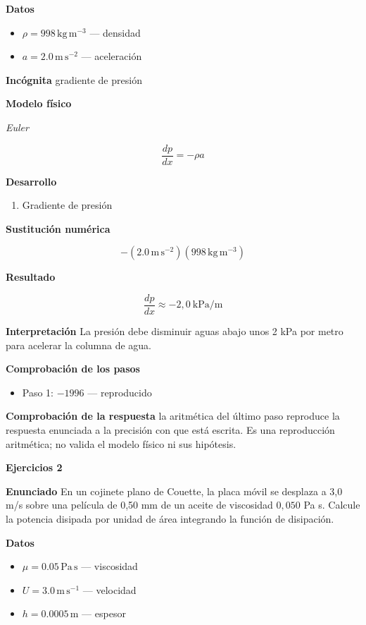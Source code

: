 \documentclass[10pt,openany]{book}
\begin{document}
\noindent\textbf{Datos}
\begin{itemize}
\item $\rho = 998\,\mathrm{kg}\,\mathrm{m}^{-3}$ — densidad
\item $a = 2.0\,\mathrm{m}\,\mathrm{s}^{-2}$ — aceleración
\end{itemize}

\noindent\textbf{Incógnita}
gradiente de presión

\noindent\textbf{Modelo físico}

\noindent\textit{Euler}

\[
\frac{dp}{dx} = -\rho a
\]

\noindent\textbf{Desarrollo}
\begin{enumerate}
\item
Gradiente de presión
\end{enumerate}

\noindent\textbf{Sustitución numérica}

\[
- \left(2.0\,\mathrm{m}\,\mathrm{s}^{-2}\right) \left(998\,\mathrm{kg}\,\mathrm{m}^{-3}\right)
\]

\noindent\textbf{Resultado}

\[
\frac{dp}{dx} \approx -2{,}0\ \mathrm{kPa/m}
\]

\noindent\textbf{Interpretación}
La presión debe disminuir aguas abajo unos 2 kPa por metro para acelerar la columna de agua.

\noindent\textbf{Comprobación de los pasos}
\begin{itemize}
\item Paso 1: $-1996$ — reproducido
\end{itemize}

\noindent\textbf{Comprobación de la respuesta} la aritmética del último paso reproduce la respuesta enunciada a la precisión con que está escrita. Es una reproducción aritmética; no valida el modelo físico ni sus hipótesis.

\noindent\textbf{Ejercicios 2}

\noindent\textbf{Enunciado}
En un cojinete plano de Couette, la placa móvil se desplaza a 3,0 m/s sobre una película de 0,50 mm de un aceite de viscosidad \(0{,}050\) Pa s. Calcule la potencia disipada por unidad de área integrando la función de disipación.

\noindent\textbf{Datos}
\begin{itemize}
\item $\mu = 0.05\,\mathrm{Pa}\,\mathrm{s}$ — viscosidad
\item $U = 3.0\,\mathrm{m}\,\mathrm{s}^{-1}$ — velocidad
\item $h = 0.0005\,\mathrm{m}$ — espesor
\end{itemize}
\end{document}
